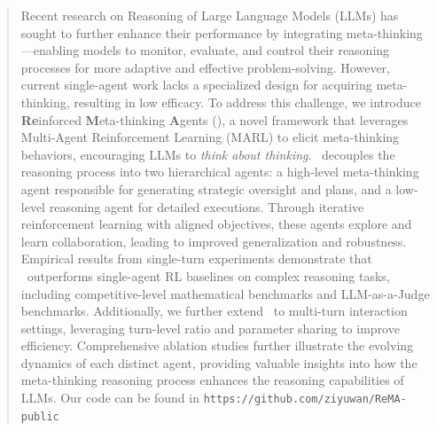 

\begin{abstract}
    Recent research on Reasoning of Large Language Models (LLMs) has sought to further enhance their performance by integrating meta-thinking---enabling models to monitor, evaluate, and control their reasoning processes for more adaptive and effective problem-solving. 
    However, current single-agent work lacks a specialized design for acquiring meta-thinking, resulting in low efficacy. 
    To address this challenge, we introduce \textbf{Re}inforced \textbf{M}eta-thinking \textbf{A}gents (\method), a novel framework that leverages Multi-Agent Reinforcement Learning (MARL) to elicit meta-thinking behaviors, encouraging LLMs to \textit{think about thinking}. 
    \method~decouples the reasoning process into two hierarchical agents: a high-level meta-thinking agent responsible for generating strategic oversight and plans, and a low-level reasoning agent for detailed executions. 
    Through iterative reinforcement learning with aligned objectives, these agents explore and learn collaboration, leading to improved generalization and robustness. 
    Empirical results from single-turn experiments demonstrate that \method~outperforms single-agent RL baselines on complex reasoning tasks, including competitive-level mathematical benchmarks and LLM-as-a-Judge benchmarks. 
    Additionally, we further extend \method~to multi-turn interaction settings, leveraging turn-level ratio and parameter sharing to improve efficiency.
    Comprehensive ablation studies further illustrate the evolving dynamics of each distinct agent, providing valuable insights into how the meta-thinking reasoning process enhances the reasoning capabilities of LLMs.
    Our code can be found in \texttt{https://github.com/ziyuwan/ReMA-public}
\end{abstract}
